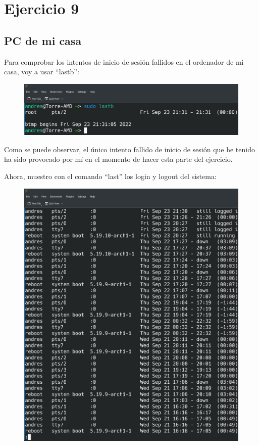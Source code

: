 \documentclass{article}
\begin{document}
\section*{Ejercicio 9}

\subsection*{PC de mi casa}
Para comprobar los intentos de inicio de sesión fallidos en el ordenador de mi casa, voy a usar ``lastb'':

\begin{figure}[H]
    \includegraphics[width=\textwidth]{imagenes/lastbcasa.png}
\end{figure}

Como se puede observar, el único intento fallido de inicio de sesión que he tenido ha sido provocado por mí en el momento de hacer esta parte del ejercicio.

Ahora, muestro con el comando ``last'' los login y logout del sistema:

\begin{figure}[H]
    \includegraphics[width=\textwidth]{imagenes/lastcasa.png}
\end{figure}
\end{document}
